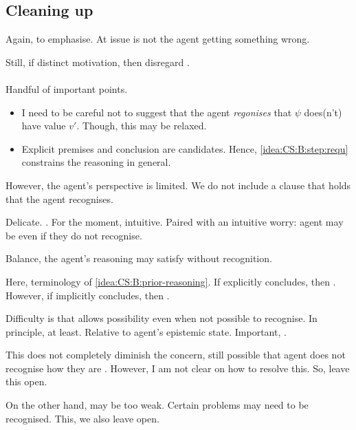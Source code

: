 \subsection{Cleaning up}
\label{sec:cleaning-up}

\begin{note}
  Again, to emphasise.
  At issue is not the agent getting something wrong.

  Still, if distinct motivation, then disregard \ideaS{}.
\end{note}

\paragraph{\ideaCS{}}

\begin{note}
  Handful of important points.
  \begin{itemize}
  \item I need to be careful not to suggest that the agent \emph{regonises} that \(\psi\) does(n't) have value \(v'\).
    Though, this may be relaxed.
  \item Explicit premises and conclusion are candidates.
  Hence, \ref{idea:CS:B:step:requ} constrains the reasoning in general.
  \end{itemize}
\end{note}

\begin{note}
  However, the agent's perspective is limited.
  We do not include a clause that holds that the agent recognises.

  Delicate.
  .
  For the moment, intuitive.
  Paired with an intuitive worry: agent may be \committed{} even if they do not recognise.

  Balance, the agent's reasoning may satisfy without recognition.

  Here,  terminology of \ref{idea:CS:B:prior-reasoning}.
  If explicitly concludes, then .
  However, if implicitly concludes, then .

  Difficulty is that \commitment{} allows possibility even when not possible to recognise.
  In principle, at least.
  Relative to agent's epistemic state.
  Important, \ep{}.

  This does not completely diminish the concern, still possible that agent does not recognise how they are \committed{}.
  However, I am not clear on how to resolve this.
  So, leave this open.

  On the other hand,  may be too weak.
  Certain problems may need to be recognised.
  This, we also leave open.
\end{note}

